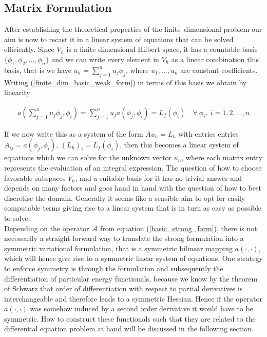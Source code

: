 \documentclass[../draft_1.tex]{subfiles}
\begin{document}
\subsection{Matrix Formulation}
After establishing the theoretical properties of the finite--dimensional problem our aim is now to recast it in a linear system of equations that can be solved efficiently. Since $V_h$ is a finite dimensional Hilbert space, it has a countable basis $\{\phi_1, \phi_2, ..., \phi_n \}$ and we can write every element in $V_h$ as a linear combination this basis, that is we have $u_h = \sum_{j=1}^{n} u_j \phi_j$, where $u_1, ..., u_n$ are constant coefficients. Writing (\ref{finite_dim_basic_weak_form}) in terms of this basis we obtain by linearity
\begin{ceqn}
\begin{equation}
\begin{aligned}
a(\sum_{j=1}^{n} u_j \phi_j, \phi_i) = \sum_{j=1}^{n} u_j a(\phi_j, \phi_i) = L_f(\phi_i) \quad \forall \ \phi_i, \ i = 1, 2, ..., n 
\end{aligned}
\end{equation}
\end{ceqn}
If we now write this as a system of the form $A u_h = L_h$ with entries entries $A_{ij} = a(\phi_j, \phi_i)$, $(L_h)_i = L_f(\phi_i)$, then this becomes a linear system of equations which we can solve for the unknown vector $u_h$, where each matrix entry represents the evaluation of an integral expression. The question of how to choose favorable subspaces $V_h$, and a suitable basis for it has no trivial answer and depends on many factors and goes hand in hand with the question of how to best discretise the domain. Generally it seems like a sensible aim to opt for easily computable terms giving rise to a linear system that is in turn as easy as possible to solve.
\smallskip
\\
Depending on the operator $\mathcal{A}$ from equation (\ref{basic_strong_form}), there is not necessarily a straight forward way to translate the strong formulation into a symmetric variational formulation, that is a symmetric bilinear mapping $a(\cdot, \cdot)$, which will hence give rise to a symmetric linear system of equations. One strategy to enforce symmetry is through the formulation and subsequently the differentiation of particular energy functionals, because we know by the theorem of Schwarz that order of differentiation with respect to partial derivatives is interchangeable and therefore leads to a symmetric Hessian. Hence if the operator $a(\cdot, \cdot)$ was somehow induced by a second order derivative it would have to be symmetric. How to construct these functionals such that they are related to the differential equation problem at hand will be discussed in the following section.
\end{document}
